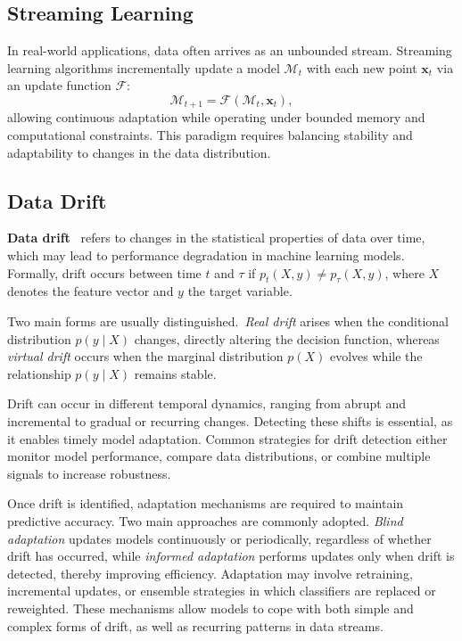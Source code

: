 \subsection{Streaming Learning}\label{sec:stream_learning}

In real-world applications, data often arrives as an unbounded stream.
Streaming learning algorithms incrementally update a model $\mathcal{M}_t$ with
each new point $\mathbf{x}_t$ via an update function $\mathcal{F}$:
\[
    \mathcal{M}_{t+1} = \mathcal{F}(\mathcal{M}_t, \mathbf{x}_t),
\]
allowing continuous adaptation while operating under bounded memory and
computational constraints. This paradigm requires balancing stability and
adaptability to changes in the data distribution.

\subsection{Data Drift}\label{sec:data_drift}

\textbf{Data drift}~\cite{drift_adaptation_survey} refers to changes in the statistical properties of data over time,
which may lead to performance degradation in machine learning models. Formally, drift
occurs between time $t$ and $\tau$ if $p_t(X, y) \neq p_\tau(X, y)$, where $X$ denotes the feature vector and $y$ the target variable.

Two main forms are usually distinguished.~\emph{Real drift} arises when the
conditional distribution $p(y \mid X)$ changes, directly altering the decision
function, whereas \emph{virtual drift} occurs when the marginal distribution
$p(X)$ evolves while the relationship $p(y \mid X)$ remains stable.

Drift can occur in different temporal dynamics, ranging from abrupt and
incremental to gradual or recurring changes. Detecting these shifts is
essential, as it enables timely model adaptation. Common strategies for drift
detection either monitor model performance, compare data distributions, or
combine multiple signals to increase robustness.

Once drift is identified, adaptation mechanisms are required to maintain
predictive accuracy. Two main approaches are commonly adopted. \emph{Blind
    adaptation} updates models continuously or periodically, regardless of whether
drift has occurred, while \emph{informed adaptation} performs updates only when
drift is detected, thereby improving efficiency. Adaptation may involve
retraining, incremental updates, or ensemble strategies in which classifiers
are replaced or reweighted. These mechanisms allow models to cope with both
simple and complex forms of drift, as well as recurring patterns in data
streams.

